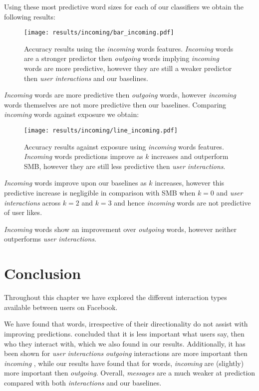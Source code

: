 Using these most predictive word sizes for each of our classifiers we obtain the following results:

\begin{figure}[h]
	\begin{center}
		\texttt{[image: results/incoming/bar\_incoming.pdf]}
		\caption{Accuracy results using the \emph{incoming} words features. \emph{Incoming} words are a 
				 stronger predictor then \emph{outgoing} words implying \emph{incoming} words are more predictive, however they are still a weaker predictor then \emph{user interactions} and our baselines.}
	\end{center}
\end{figure}

\emph{Incoming} words are more predictive then \emph{outgoing} words, however \emph{incoming} words themselves are not more predictive then our baselines.
Comparing \emph{incoming} words against exposure we obtain:

\clearpage

\begin{figure}[h]
	\begin{center}
		\texttt{[image: results/incoming/line\_incoming.pdf]}
		\caption{Accuracy results against exposure using \emph{incoming} words features. 
				 \emph{Incoming} words predictions improve as $k$ increases and outperform SMB, however they are still less predictive then \emph{user interactions}.
		}
	\end{center}
\end{figure}



\emph{Incoming} words improve upon our baselines as $k$ increases, however this predictive increase is 
negligible in comparison with SMB when $k = 0$ and \emph{user interactions} across $k=2$ and $k=3$ and 
hence \emph{incoming} words are not predictive of user likes.

\emph{Incoming} words show an improvement over \emph{outgoing} words, however neither outperforms \emph{user interactions}.

\section{Conclusion}
\label{sec:conc}

Throughout this chapter we have explored the different interaction types available between users on Facebook. 

We have found that words, irrespective of their directionality do not assist with improving predictions. \cite{Anderson2012} concluded 
that it is less important what users say, then who they interact with, which we also found in our results. Additionally, it has been shown
for \emph{user interactions} \emph{outgoing} interactions are more important then \emph{incoming} \cite{www}, while our results have found that
for words, \emph{incoming} are (slightly) more important then \emph{outgoing}. Overall, \emph{messages} are a much weaker at prediction compared 
with both \emph{interactions} and our baselines.

